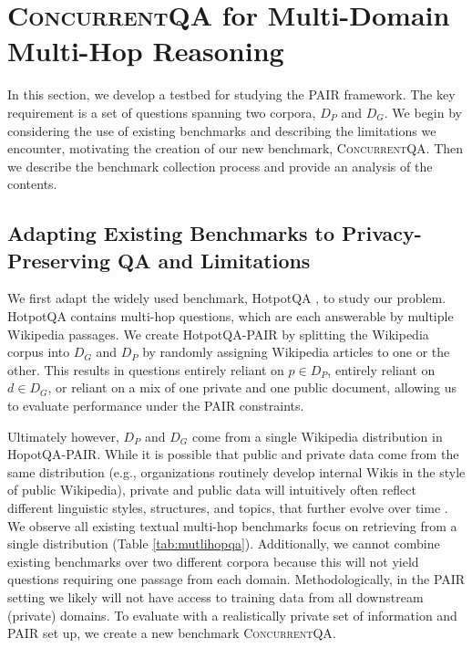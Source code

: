 \documentclass{article}
\renewcommand\cite{\citep}	\newcommand\shortcite{\citeyearpar}\newcommand\newcite{\citet}
\newcommand{\datasetname}{\textsc{ConcurrentQA}\xspace}
\newcommand{\problemshortname}{\textsc{PAIR}\xspace}
\begin{document}
\section{\datasetname for Multi-Domain Multi-Hop Reasoning}
\label{sec:benchmark}
In this section, we develop a testbed for studying the \problemshortname framework. The key requirement is a set of questions spanning two corpora, ${D_P}$ and ${D_G}$. We begin by considering the use of existing benchmarks and describing the limitations we encounter, motivating the creation of our new benchmark, \datasetname. Then we describe the benchmark collection process and provide an analysis of the contents.


\subsection{Adapting Existing Benchmarks to Privacy-Preserving QA and Limitations}  We first adapt the widely used benchmark, HotpotQA \cite{yang2018hotpotqa}, to study our problem. 
HotpotQA contains multi-hop questions, which are each answerable by multiple Wikipedia passages. We create HotpotQA-\problemshortname by splitting the Wikipedia corpus into ${D_G}$ and ${D_P}$ by randomly assigning Wikipedia articles to one or the other. This results in questions entirely reliant on $p \in {D_P}$, entirely reliant on $d \in {D_G}$, or reliant on a mix of one private and one public document, allowing us to evaluate performance under the \problemshortname constraints.


Ultimately however, $D_P$ and $D_G$ come from a single Wikipedia distribution in HopotQA-PAIR.
While it is possible that public and private data come from the same distribution (e.g., organizations routinely develop internal Wikis in the style of public Wikipedia), private and public data will intuitively often reflect different linguistic styles, structures, and topics, that further evolve over time \cite{hawking2004enterprisesearch}. 
We observe all existing textual multi-hop benchmarks focus on retrieving from a single distribution (Table \ref{tab:mutlihopqa}). Additionally, we cannot combine existing benchmarks over two different corpora because this will not yield questions requiring one passage from each domain. 
Methodologically, in the \problemshortname setting we likely will not have access to training data from all downstream (private) domains. 
To evaluate with a realistically private set of information and \problemshortname set up, we create a new benchmark \datasetname.
\end{document}
